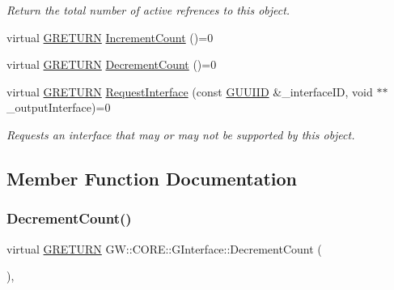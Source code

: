 \begin{DoxyCompactItemize}
\begin{DoxyCompactList}\small\item\em Return the total number of active refrences to this object. \end{DoxyCompactList}\item 
virtual \hyperlink{namespace_g_w_a69b1aaebac1cac8049825f035884c95b}{G\+R\+E\+T\+U\+RN} \hyperlink{class_g_w_1_1_c_o_r_e_1_1_g_interface_a3e04e58eef4f3e3f56ff7fb751194c37}{Increment\+Count} ()=0
\item 
virtual \hyperlink{namespace_g_w_a69b1aaebac1cac8049825f035884c95b}{G\+R\+E\+T\+U\+RN} \hyperlink{class_g_w_1_1_c_o_r_e_1_1_g_interface_af6924e12b14f217b518fc91c63d9703d}{Decrement\+Count} ()=0
\item 
\hypertarget{class_g_w_1_1_c_o_r_e_1_1_g_interface_ab1414aa07bca310a824ee01a91657ad0}{}\label{class_g_w_1_1_c_o_r_e_1_1_g_interface_ab1414aa07bca310a824ee01a91657ad0} 
virtual \hyperlink{namespace_g_w_a69b1aaebac1cac8049825f035884c95b}{G\+R\+E\+T\+U\+RN} \hyperlink{class_g_w_1_1_c_o_r_e_1_1_g_interface_ab1414aa07bca310a824ee01a91657ad0}{Request\+Interface} (const \hyperlink{struct_g_w_1_1_g_u_u_i_i_d}{G\+U\+U\+I\+ID} \&\+\_\+interface\+ID, void $\ast$$\ast$\+\_\+output\+Interface)=0
\begin{DoxyCompactList}\small\item\em Requests an interface that may or may not be supported by this object. \end{DoxyCompactList}\end{DoxyCompactItemize}


\subsection{Member Function Documentation}
\hypertarget{class_g_w_1_1_c_o_r_e_1_1_g_interface_af6924e12b14f217b518fc91c63d9703d}{}\label{class_g_w_1_1_c_o_r_e_1_1_g_interface_af6924e12b14f217b518fc91c63d9703d} 
\subsubsection{\texorpdfstring{Decrement\+Count()}{DecrementCount()}}
{\footnotesize\ttfamily virtual \hyperlink{namespace_g_w_a69b1aaebac1cac8049825f035884c95b}{G\+R\+E\+T\+U\+RN} G\+W\+::\+C\+O\+R\+E\+::\+G\+Interface\+::\+Decrement\+Count (\begin{DoxyParamCaption}{ }\end{DoxyParamCaption})\hspace{0.3cm}{\ttfamily [pure virtual]}, {\ttfamily [inherited]}}

